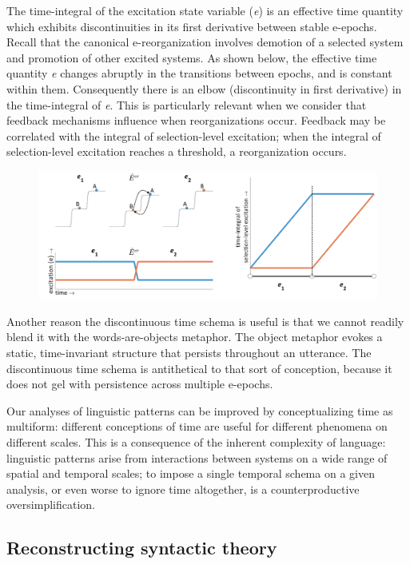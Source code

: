   The time-integral of the excitation state variable (\textit{e}) is an effective time quantity which exhibits discontinuities in its first derivative between stable e-epochs. Recall that the canonical e-reorganization involves demotion of a selected system and promotion of other excited systems. As shown below, the effective time quantity \textit{e} changes abruptly in the transitions between epochs, and is constant within them. Consequently there is an elbow (discontinuity in first derivative) in the time-integral of \textit{e}. This is particularly relevant when we consider that feedback mechanisms influence when reorganizations occur. Feedback may be correlated with the integral of selection-level excitation; when the integral of selection-level excitation reaches a threshold, a reorganization occurs.

  
\begin{figure}
\includegraphics[width=\textwidth]{figures/Tilsen-img50.png}
\caption{\missingcaption}
\label{fig:}
\end{figure}
 

  Another reason the discontinuous time schema is useful is that we cannot readily blend it with the words-are-objects metaphor. The object metaphor evokes a static, time-invariant structure that persists throughout an utterance. The discontinuous time schema is antithetical to that sort of conception, because it does not gel with persistence across multiple e-epochs. 

  Our analyses of linguistic patterns can be improved by conceptualizing time as multiform: different conceptions of time are useful for different phenomena on different scales. This is a consequence of the inherent complexity of language: linguistic patterns arise from interactions between systems on a wide range of spatial and temporal scales; to impose a single temporal schema on a given analysis, or even worse to ignore time altogether, is a counterproductive oversimplification. 

\subsection{Reconstructing syntactic theory}

